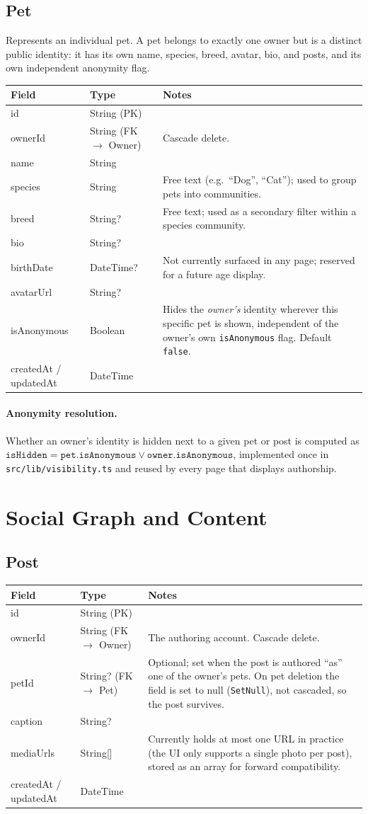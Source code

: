 \documentclass[11pt,a4paper]{article}
\makeatletter
\newcommand{\modeltable}[1]{%
  \begin{tabular}{@{}p{3.3cm}p{2.6cm}p{8.3cm}@{}}
  \toprule
  \textbf{Field} & \textbf{Type} & \textbf{Notes} \\
  \midrule
  #1
  \bottomrule
  \end{tabular}
}
\makeatother
\begin{document}
\subsection{Pet}
Represents an individual pet. A pet belongs to exactly one owner but is a distinct
public identity: it has its own name, species, breed, avatar, bio, and posts, and its
own independent anonymity flag.

\modeltable{
id & String (PK) & \\
ownerId & String (FK $\to$ Owner) & Cascade delete. \\
name & String & \\
species & String & Free text (e.g.\ ``Dog'', ``Cat''); used to group pets into
  communities. \\
breed & String? & Free text; used as a secondary filter within a species community. \\
bio & String? & \\
birthDate & DateTime? & Not currently surfaced in any page; reserved for a future age
  display. \\
avatarUrl & String? & \\
isAnonymous & Boolean & Hides the \emph{owner's} identity wherever this specific pet is
  shown, independent of the owner's own \texttt{isAnonymous} flag. Default
  \texttt{false}. \\
createdAt / updatedAt & DateTime & \\
}

\paragraph{Anonymity resolution.} Whether an owner's identity is hidden next to a given
pet or post is computed as
$\texttt{isHidden} = \texttt{pet.isAnonymous} \lor \texttt{owner.isAnonymous}$,
implemented once in \texttt{src/lib/visibility.ts} and reused by every page that
displays authorship.

\section{Social Graph and Content}

\subsection{Post}
\modeltable{
id & String (PK) & \\
ownerId & String (FK $\to$ Owner) & The authoring account. Cascade delete. \\
petId & String? (FK $\to$ Pet) & Optional; set when the post is authored ``as'' one of
  the owner's pets. On pet deletion the field is set to null (\texttt{SetNull}), not
  cascaded, so the post survives. \\
caption & String? & \\
mediaUrls & String[] & Currently holds at most one URL in practice (the UI only
  supports a single photo per post), stored as an array for forward compatibility. \\
createdAt / updatedAt & DateTime & \\
}
\end{document}

